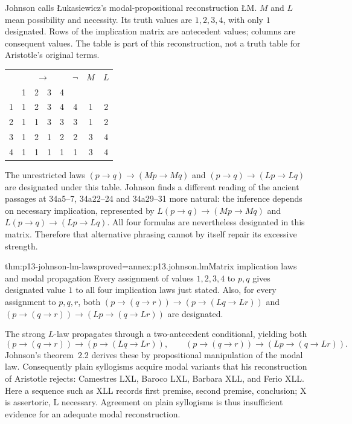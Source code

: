Johnson calls \L{}ukasiewicz's modal-propositional reconstruction
\L{}M. \(M\) and \(L\) mean possibility and necessity. Its truth
values are \(1,2,3,4\), with only \(1\) designated.
Rows of the implication matrix are antecedent values; columns are
consequent values. The table is part of this reconstruction, not a
truth table for Aristotle's original terms.
\parencite[pp.~258--260]{Johnson2004ModalSyllogisms}

\begin{tabular}{@{}c|cccc|ccc@{}}
 & \multicolumn{4}{c|}{\(\to\)} & \(\neg\) & \(M\) & \(L\)\\
 &1&2&3&4&&&\\ \hline
1&1&2&3&4&4&1&2\\
2&1&1&3&3&3&1&2\\
3&1&2&1&2&2&3&4\\
4&1&1&1&1&1&3&4
\end{tabular}

The unrestricted laws
\((p\to q)\to(Mp\to Mq)\) and
\((p\to q)\to(Lp\to Lq)\) are designated under this table.
Johnson finds a different reading of the ancient passages at
34a5--7, 34a22--24 and 34a29--31 more natural: the inference depends
on necessary implication, represented by
\(L(p\to q)\to(Mp\to Mq)\) and
\(L(p\to q)\to(Lp\to Lq)\). All four formulas are nevertheless
designated in this matrix. Therefore that alternative phrasing cannot
by itself repair its excessive strength.

\begin{hbtheorem}{thm:p13-johnson-lm-laws}{proved=annex:p13.johnson.lm}{Matrix implication laws and modal propagation}
Every assignment of values \(1,2,3,4\) to \(p,q\) gives designated
value \(1\) to all four implication laws just stated.
Also, for every assignment to \(p,q,r\), both
\((p\to(q\to r))\to(p\to(Lq\to Lr))\) and
\((p\to(q\to r))\to(Lp\to(q\to Lr))\) are designated.
\end{hbtheorem}

The strong \(L\)-law propagates through a two-antecedent conditional,
yielding both
\[
 (p\to(q\to r))\to(p\to(Lq\to Lr)),\qquad
 (p\to(q\to r))\to(Lp\to(q\to Lr)).
\]
Johnson's theorem~2.2 derives these by propositional manipulation of
the modal law. Consequently plain syllogisms acquire modal variants
that his reconstruction of Aristotle rejects: Camestres LXL,
Baroco LXL, Barbara XLL, and Ferio XLL. Here a sequence such as XLL
records first premise, second premise, conclusion; X is assertoric,
L necessary. Agreement on plain syllogisms is thus insufficient evidence
for an adequate modal reconstruction.

